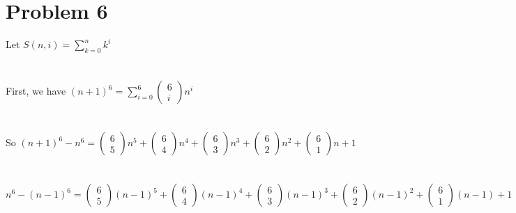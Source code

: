 \documentclass{article}
\begin{document}
\section{Problem 6}
Let $S(n,i) = \sum_{k=0}^{n} k^i$\\
\\ \hspace*{\fill} \\
First, we have $(n+1)^6 = \sum_{i=0}^{6} \begin{pmatrix}
6\\
i
\end{pmatrix} n^i$\\
\\ \hspace*{\fill} \\
So $(n+1)^6 - n^6 = \begin{pmatrix}
6\\
5
\end{pmatrix} n^5 + \begin{pmatrix}
6\\
4
\end{pmatrix} n^4 + \begin{pmatrix}
6\\
3
\end{pmatrix} n^3 + \begin{pmatrix}
6\\
2
\end{pmatrix} n^2 + \begin{pmatrix}
6\\
1
\end{pmatrix} n + 1$\\
\\ \hspace*{\fill} \\
$n^6 - (n-1)^6 = \begin{pmatrix}
6\\
5
\end{pmatrix} (n-1)^5 + \begin{pmatrix}
6\\
4
\end{pmatrix} (n-1)^4 + \begin{pmatrix}
6\\
3
\end{pmatrix} (n-1)^3 + \begin{pmatrix}
6\\
2
\end{pmatrix} (n-1)^2 + \begin{pmatrix}
6\\
1
\end{pmatrix} (n-1) + 1$\\
\end{document}
